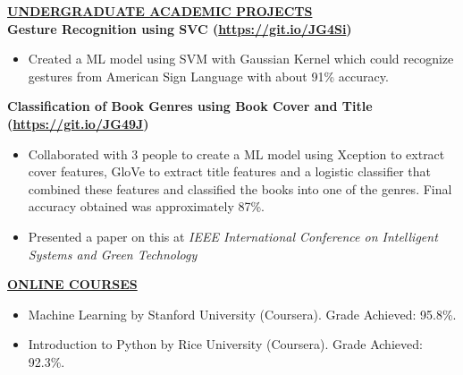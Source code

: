 \documentclass{article}
\begin{document}
\noindent \textbf{\underline{UNDERGRADUATE ACADEMIC PROJECTS}} \\
\noindent \textbf{Gesture Recognition using SVC (\url{https://git.io/JG4Si})} 
\begin{itemize}[noitemsep,nolistsep,leftmargin=*]
\item {Created a ML model using SVM with Gaussian Kernel which could recognize gestures from American Sign Language with about 91\% accuracy. \\}
\end{itemize}

\noindent \textbf{Classification of Book Genres using Book Cover and Title (\url{https://git.io/JG49J})} 
\begin{itemize}[noitemsep,nolistsep,leftmargin=*]
\item {Collaborated with 3 people to create a ML model using Xception to extract cover features, GloVe to extract title features and a logistic classifier that combined these features and classified the books into one of the genres. Final accuracy obtained was approximately 87\%.}
\item {Presented a paper on this at \textit{IEEE International Conference on Intelligent Systems and Green Technology}\\}
\end{itemize}


\noindent \textbf{\underline{ONLINE COURSES}}
\begin{itemize}[noitemsep,nolistsep,leftmargin=*]
\item {Machine Learning by Stanford University (Coursera). Grade Achieved: 95.8\%.} 
\item {Introduction to Python by Rice University (Coursera). Grade Achieved: 92.3\%.}
\end{itemize}
\end{document}
